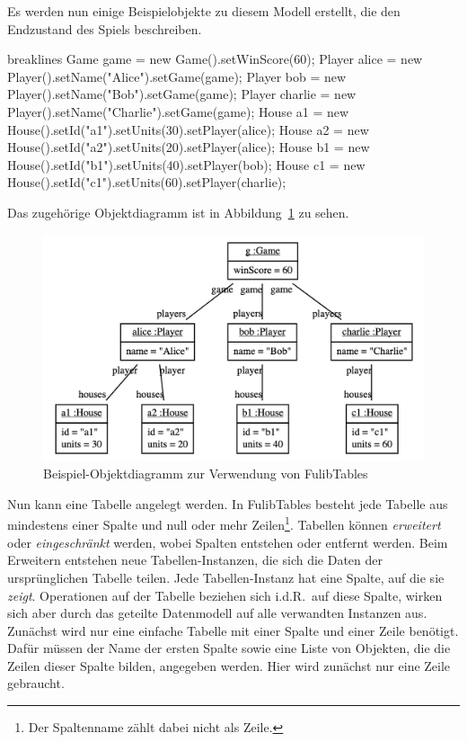 Es werden nun einige Beispielobjekte zu diesem Modell erstellt, die den Endzustand des Spiels beschreiben.

\begin{jcodeblock*}{breaklines}
    Game game = new Game().setWinScore(60);
    Player alice = new Player().setName("Alice").setGame(game);
    Player bob = new Player().setName("Bob").setGame(game);
    Player charlie = new Player().setName("Charlie").setGame(game);
    House a1 = new House().setId("a1").setUnits(30).setPlayer(alice);
    House a2 = new House().setId("a2").setUnits(20).setPlayer(alice);
    House b1 = new House().setId("b1").setUnits(40).setPlayer(bob);
    House c1 = new House().setId("c1").setUnits(60).setPlayer(charlie);
\end{jcodeblock*}

Das zugehörige Objektdiagramm ist in Abbildung~\ref{fig:game-object-diagram} zu sehen.

\begin{figure}
    \includegraphics[width=\textwidth]{chapter/pattern-matching/img/game-object-diagram.png}
    \caption{Beispiel-Objektdiagramm zur Verwendung von FulibTables}
    \label{fig:game-object-diagram}
\end{figure}

Nun kann eine Tabelle angelegt werden.
In FulibTables besteht jede Tabelle aus mindestens einer Spalte und null oder mehr Zeilen\footnote{Der Spaltenname zählt dabei nicht als Zeile.}.
Tabellen können \emph{erweitert} oder \emph{eingeschränkt} werden, wobei Spalten entstehen oder entfernt werden.
Beim Erweitern entstehen neue Tabellen-Instanzen,
die sich die Daten der ursprünglichen Tabelle teilen.
Jede Tabellen-Instanz hat eine Spalte, auf die sie \emph{zeigt}.
Operationen auf der Tabelle beziehen sich i.d.R.\ auf diese Spalte,
wirken sich aber durch das geteilte Datenmodell auf alle verwandten Instanzen aus.
Zunächst wird nur eine einfache Tabelle mit einer Spalte und einer Zeile benötigt.
Dafür müssen der Name der ersten Spalte sowie eine Liste von Objekten, die die Zeilen dieser Spalte bilden, angegeben werden.
Hier wird zunächst nur eine Zeile gebraucht.

